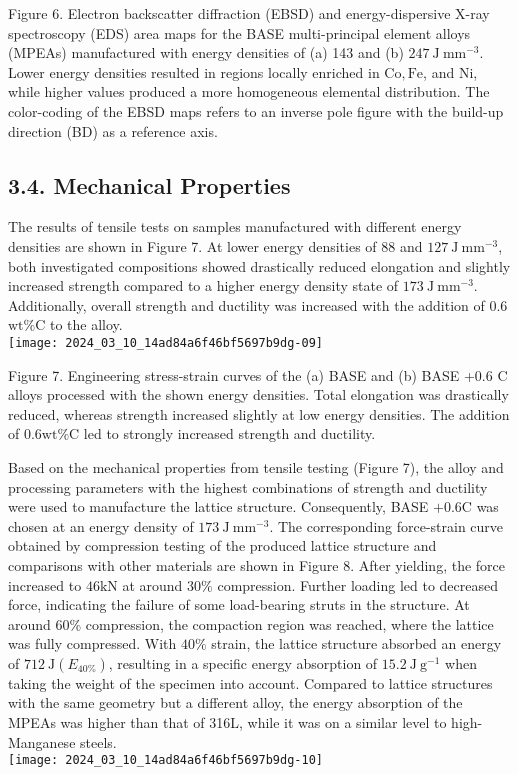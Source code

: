 \documentclass[10pt]{article}
\begin{document}
Figure 6. Electron backscatter diffraction (EBSD) and energy-dispersive X-ray spectroscopy (EDS) area maps for the BASE multi-principal element alloys (MPEAs) manufactured with energy densities of (a) 143 and (b) $247 \mathrm{~J} \mathrm{~mm}^{-3}$. Lower energy densities resulted in regions locally enriched in $\mathrm{Co}, \mathrm{Fe}$, and $\mathrm{Ni}$, while higher values produced a more homogeneous elemental distribution. The color-coding of the EBSD maps refers to an inverse pole figure with the build-up direction (BD) as a reference axis.

\subsection*{3.4. Mechanical Properties}
The results of tensile tests on samples manufactured with different energy densities are shown in Figure 7. At lower energy densities of 88 and $127 \mathrm{~J} \mathrm{~mm}^{-3}$, both investigated compositions showed drastically reduced elongation and slightly increased strength compared to a higher energy density state of $173 \mathrm{~J} \mathrm{~mm}^{-3}$. Additionally, overall strength and ductility was increased with the addition of 0.6 $\mathrm{wt} \% \mathrm{C}$ to the alloy.\\
\texttt{[image: 2024\_03\_10\_14ad84a6f46bf5697b9dg-09]}

Figure 7. Engineering stress-strain curves of the (a) BASE and (b) BASE +0.6 C alloys processed with the shown energy densities. Total elongation was drastically reduced, whereas strength increased slightly at low energy densities. The addition of $0.6 \mathrm{wt} \% \mathrm{C}$ led to strongly increased strength and ductility.

Based on the mechanical properties from tensile testing (Figure 7), the alloy and processing parameters with the highest combinations of strength and ductility were used to manufacture the lattice structure. Consequently, BASE $+0.6 \mathrm{C}$ was chosen at an energy density of $173 \mathrm{~J} \mathrm{~mm}^{-3}$. The corresponding force-strain curve obtained by compression testing of the produced lattice structure and comparisons with other materials are shown in Figure 8. After yielding, the force increased to $46 \mathrm{kN}$ at around $30 \%$ compression. Further loading led to decreased force, indicating the failure of some load-bearing struts in the structure. At around $60 \%$ compression, the compaction region was reached, where the lattice was fully compressed. With $40 \%$ strain, the lattice structure absorbed an energy of $712 \mathrm{~J}\left(E_{40 \%}\right)$, resulting in a specific energy absorption of $15.2 \mathrm{~J} \mathrm{~g}^{-1}$ when taking the weight of the specimen into account. Compared to lattice structures with the same geometry but a different alloy, the energy absorption of the MPEAs was higher than that of 316L, while it was on a similar level to high-Manganese steels.\\
\texttt{[image: 2024\_03\_10\_14ad84a6f46bf5697b9dg-10]}
\end{document}
